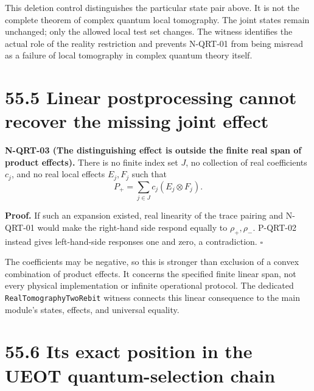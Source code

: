 \documentclass[
  11pt,
  oneside]{book}
\begin{document}
This deletion control distinguishes the particular state pair above. It
is not the complete theorem of complex quantum local tomography. The
joint states remain unchanged; only the allowed local test set changes.
The witness identifies the actual role of the reality restriction and
prevents N-QRT-01 from being misread as a failure of local tomography in
complex quantum theory itself.

\section{55.5 Linear postprocessing cannot recover the missing joint
effect}

\label{n-qrt-03}{}

\textbf{N-QRT-03 (The distinguishing effect is outside the finite real
span of product effects).} There is no finite index set \(J\), no
collection of real coefficients \(c_j\), and no real local effects
\(E_j,F_j\) such that \[
P_+=\sum_{j\in J}c_j(E_j\otimes F_j).
\]

\textbf{Proof.} If such an expansion existed, real linearity of the
trace pairing and N-QRT-01 would make the right-hand side respond
equally to \(\rho_+,\rho_-\). P-QRT-02 instead gives left-hand-side
responses one and zero, a contradiction. \(\square\)

The coefficients may be negative, so this is stronger than exclusion of
a convex combination of product effects. It concerns the specified
finite linear span, not every physical implementation or infinite
operational protocol. The dedicated \texttt{Real\allowbreak Tomography\allowbreak Two\allowbreak Rebit}
witness connects this linear consequence to the main module's states,
effects, and universal equality.

\section{55.6 Its exact position in the UEOT quantum-selection chain}
\end{document}
